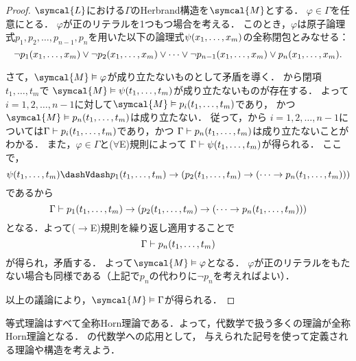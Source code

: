 \begin{proof}
	\(\symcal{L}\)における\(\Gamma\)のHerbrand構造を\(\symcal{M}\)とする．
	\(\varphi \in \Gamma\)を任意にとる．
	\(\varphi\)が正のリテラルを1つもつ場合を考える．
	このとき，\(\varphi\)は原子論理式\(p_1, p_2, \dots, p_{n-1}, p_n\)を用いた以下の論理式\(\apply{\psi}{x_1, \dots, x_m}\)の全称閉包とみなせる：
	\[
		\lnot \apply{p_1}{x_1, \dots, x_m} \lor \lnot \apply{p_2}{x_1, \dots, x_m} \lor \dotsb \lor \lnot \apply{p_{n-1}}{x_1, \dots, x_m}
		\lor \apply{p_{n}}{x_1, \dots, x_m}.
	\]

	さて，\(\symcal{M} \satisfy \varphi\)が成り立たないものとして矛盾を導く．
	から閉項\(t_1, \dots, t_m\)で
	\(\symcal{M} \satisfy \apply{\psi}{t_1, \dots, t_m}\)が成り立たないものが存在する．
	よって\(i = 1, 2, \dots, n-1\)に対して\(\symcal{M} \satisfy \apply{p_i}{t_1, \dots, t_m}\)であり，
	かつ\(\symcal{M} \satisfy \apply{p_n}{t_1, \dots, t_m}\)は成り立たない．
	従って，から
	\(i = 1,2,\dots, n-1\)については\(\Gamma \provable \apply{p_i}{t_1, \dots, t_m}\)であり，かつ
	\(\Gamma \provable \apply{p_n}{t_1, \dots, t_m}\)は成り立たないことがわかる．
	また，\(\varphi \in \Gamma\)と(\(\forall\)E)規則によって
	\(\Gamma \provable \apply{\psi}{t_1, \dots, t_m}\)が得られる．
	ここで，
	\[
		\apply{\psi}{t_1, \dots, t_m} \interderivable \apply{p_1}{t_1, \dots, t_m} \to \paren{\apply{p_2}{t_1, \dots, t_m} \to \paren{\dotsb \to \apply{p_n}{t_1, \dots, t_m}}}
	\]
	であるから
	\[
		\Gamma \provable \apply{p_1}{t_1, \dots, t_m} \to \paren{\apply{p_2}{t_1, \dots, t_m} \to \paren{\dotsb \to \apply{p_n}{t_1, \dots, t_m}}}
	\]
	となる．よって(\(\to\)E)規則を繰り返し適用することで
	\[
		\Gamma \provable \apply{p_n}{t_1, \dots, t_m}
	\]
	が得られ，矛盾する．
	よって\(\symcal{M} \satisfy \varphi\)となる．
	\(\varphi\)が正のリテラルをもたない場合も同様である（上記で\(p_n\)の代わりに\(\lnot p_n\)を考えればよい）．

	以上の議論により，\(\symcal{M} \satisfy \Gamma\)が得られる．
\end{proof}


等式理論はすべて全称Horn理論である．よって，代数学で扱う多くの理論が全称Horn理論となる．
の代数学への応用として，
与えられた記号を使って定義される理論や構造を考えよう．

